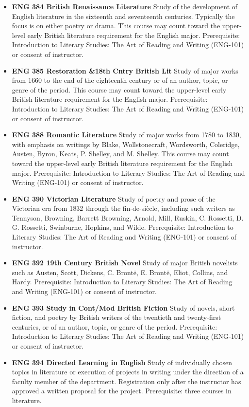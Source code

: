 \documentclass[
  letterpaper,
]{scrbook}
\begin{document}
\begin{itemize}
  (ENG-101) or consent of instructor.\\
\item
  \textbf{ENG 384 British Renaissance Literature} Study of the
  development of English literature in the sixteenth and seventeenth
  centuries. Typically the focus is on either poetry or drama. This
  course may count toward the upper-level early British literature
  requirement for the English major. Prerequisite: Introduction to
  Literary Studies: The Art of Reading and Writing (ENG-101) or consent
  of instructor.\\
\item
  \textbf{ENG 385 Restoration \&18th Cntry British Lit} Study of major
  works from 1660 to the end of the eighteenth century or of an author,
  topic, or genre of the period. This course may count toward the
  upper-level early British literature requirement for the English
  major. Prerequisite: Introduction to Literary Studies: The Art of
  Reading and Writing (ENG-101) or consent of instructor.\\
\item
  \textbf{ENG 388 Romantic Literature} Study of major works from 1780 to
  1830, with emphasis on writings by Blake, Wollstonecraft, Wordsworth,
  Coleridge, Austen, Byron, Keats, P. Shelley, and M. Shelley. This
  course may count toward the upper-level early British literature
  requirement for the English major. Prerequisite: Introduction to
  Literary Studies: The Art of Reading and Writing (ENG-101) or consent
  of instructor.\\
\item
  \textbf{ENG 390 Victorian Literature} Study of poetry and prose of the
  Victorian era from 1832 through the fin-de-siècle, including such
  writers as Tennyson, Browning, Barrett Browning, Arnold, Mill, Ruskin,
  C. Rossetti, D. G. Rossetti, Swinburne, Hopkins, and Wilde.
  Prerequisite: Introduction to Literary Studies: The Art of Reading and
  Writing (ENG-101) or consent of instructor.\\
\item
  \textbf{ENG 392 19th Century British Novel} Study of major British
  novelists such as Austen, Scott, Dickens, C. Brontë, E. Brontë, Eliot,
  Collins, and Hardy. Prerequisite: Introduction to Literary Studies:
  The Art of Reading and Writing (ENG-101) or consent of instructor.\\
\item
  \textbf{ENG 393 Study in Cont/Mod British Fiction} Study of novels,
  short fiction, and poetry by British writers of the twentieth and
  twenty-first centuries, or of an author, topic, or genre of the
  period. Prerequisite: Introduction to Literary Studies: The Art of
  Reading and Writing (ENG-101) or consent of instructor.\\
\item
  \textbf{ENG 394 Directed Learning in English} Study of individually
  chosen topics in literature or execution of projects in writing under
  the direction of a faculty member of the department. Registration only
  after the instructor has approved a written proposal for the project.
  Prerequisite: three courses in literature.
\end{itemize}
\end{document}
